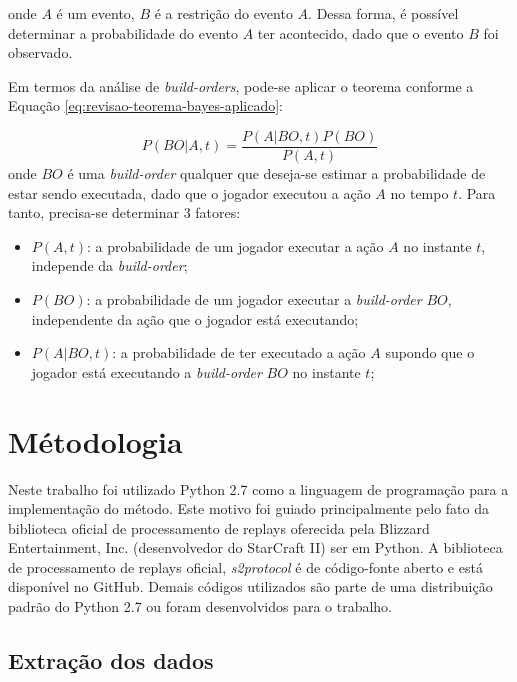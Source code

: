 \noindent onde $A$ é um evento, $B$ é a restrição do evento $A$. Dessa forma, é possível determinar a probabilidade do evento $A$ ter acontecido, dado que o evento $B$ foi observado.

Em termos da análise de \textit{\glspl{build-order}}, pode-se aplicar o teorema conforme a Equação \ref{eq:revisao-teorema-bayes-aplicado}:

\begin{equation}
	P(BO|A, t) = \frac{P(A|BO, t)P(BO)}{P(A, t)}
	\label{eq:revisao-teorema-bayes-aplicado}
\end{equation}
\noindent onde $BO$ é uma \textit{\gls{build-order}} qualquer que deseja-se estimar a probabilidade de estar sendo executada, dado que o jogador executou a ação $A$ no tempo $t$. Para tanto, precisa-se determinar 3 fatores:

\begin{itemize}
	\item $P(A, t)$: a probabilidade de um jogador executar a ação $A$ no instante $t$, independe da \textit{\gls{build-order}};
	\item $P(BO)$: a probabilidade de um jogador executar a \textit{\gls{build-order}} $BO$, independente da ação que o jogador está executando;
	\item $P(A|BO, t)$: a probabilidade de ter executado a ação $A$ supondo que o jogador está executando a \textit{\gls{build-order}} $BO$ no instante $t$;
\end{itemize}

	\chapter{Métodologia}
Neste trabalho foi utilizado Python 2.7 como a linguagem de programação para a implementação do método. Este motivo foi guiado principalmente pelo fato da biblioteca oficial de processamento de \glspl{replay} oferecida pela Blizzard Entertainment, Inc. (desenvolvedor do StarCraft II) ser em Python. A biblioteca de processamento de \glspl{replay} oficial, \textit{s2protocol}\cite{s2protocol} é de código-fonte aberto e está disponível no GitHub. Demais códigos utilizados são parte de uma distribuição padrão do Python 2.7 ou foram desenvolvidos para o trabalho.

		\section{Extração dos dados}

